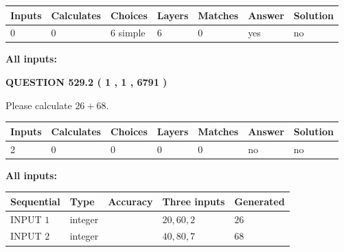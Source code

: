 \documentclass[12pt]{article}
\begin{document}
 
\noindent{}
 
 
   
   
   
   
\noindent\begin{tabular}{|l|l|l|l|l|l|l|}
 \hline
Inputs & Calculates & Choices & Layers & Matches & Answer & Solution \\ \hline
 0  & 
 0  & 
 6
  simple  
  & 
 6  & 
 0  & 
  yes & 
  no 
  \\ \hline
 \end{tabular}
   
   
   
   
\noindent{}
   
   
   
   
\noindent\vspace{0.1in}\hspace{-0.08in} {\textbf{\Large{All inputs: }}}
   
   
  
\vspace{0.2in}
  
{\textbf{\Large{QUESTION
529.2 
 ( 1 , 1 , 6791 )
}}}
  
  
 
Please calculate $ %
26 +  %
68 $.
 
 
   
   
   
   
\noindent\begin{tabular}{|l|l|l|l|l|l|l|}
 \hline
Inputs & Calculates & Choices & Layers & Matches & Answer & Solution \\ \hline
 2  & 
 0  & 
 0
  & 
 0  & 
 0  & 
  no & 
  no 
  \\ \hline
 \end{tabular}
   
   
   
   
\noindent{}
   
   
   
   
\noindent\vspace{0.1in}\hspace{-0.08in} {\textbf{\Large{All inputs: }}}
   
   
  
  
\noindent\begin{tabular}{|l|l|l|l|l|}
\hline
 Sequential & Type & Accuracy & Three inputs & Generated \\ 
\hline
 
 
  INPUT $  1 $ & integer &  & $
 20
 , 
 60
 , 
 2
 $ & $ 26 $ 
 \\  \hline  
 
 
  INPUT $  2 $ & integer &  & $
 40
 , 
 80
 , 
 7
 $ & $ 68 $ 
 \\  \hline  
 \end{tabular}
   
\end{document}
